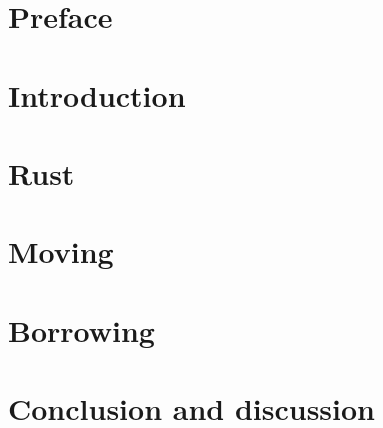 \documentclass{report}
\begin{document}


\chapter*{Preface}


\tableofcontents

\chapter{Introduction}


\chapter{Rust}


\chapter{Moving}


\chapter{Borrowing}


%

%

%

\chapter{Conclusion and discussion}


%



\end{document}
